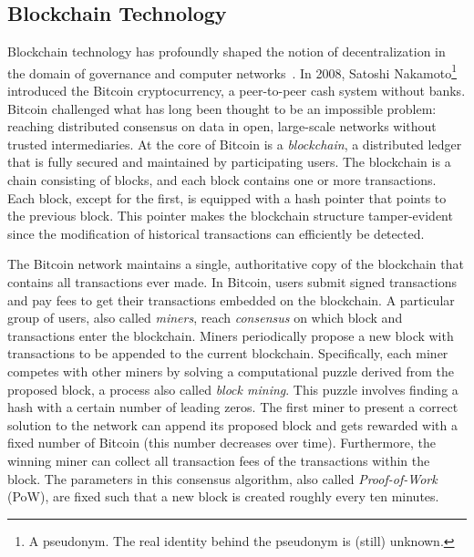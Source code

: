 \subsection{Blockchain Technology}
Blockchain technology has profoundly shaped the notion of decentralization in the domain of governance and computer networks~\cite{aste2017blockchain}.
In 2008, Satoshi Nakamoto\footnote{A pseudonym. The real identity behind the pseudonym is (still) unknown.} introduced the Bitcoin cryptocurrency, a peer-to-peer cash system without banks.
Bitcoin challenged what has long been thought to be an impossible problem: reaching distributed consensus on data in open, large-scale networks without trusted intermediaries.
At the core of Bitcoin is a \emph{blockchain}, a distributed ledger that is fully secured and maintained by participating users.
The blockchain is a chain consisting of blocks, and each block contains one or more transactions.
Each block, except for the first, is equipped with a hash pointer that points to the previous block.
This pointer makes the blockchain structure tamper-evident since the modification of historical transactions can efficiently be detected.

The Bitcoin network maintains a single, authoritative copy of the blockchain that contains all transactions ever made.
In Bitcoin, users submit signed transactions and pay fees to get their transactions embedded on the blockchain.
A particular group of users, also called \emph{miners}, reach \emph{consensus} on which block and transactions enter the blockchain.
Miners periodically propose a new block with transactions to be appended to the current blockchain.
Specifically, each miner competes with other miners by solving a computational puzzle derived from the proposed block, a process also called \emph{block mining}.
This puzzle involves finding a hash with a certain number of leading zeros.
The first miner to present a correct solution to the network can append its proposed block and gets rewarded with a fixed number of Bitcoin (this number decreases over time).
Furthermore, the winning miner can collect all transaction fees of the transactions within the block.
The parameters in this consensus algorithm, also called \emph{Proof-of-Work} (PoW), are fixed such that a new block is created roughly every ten minutes.

